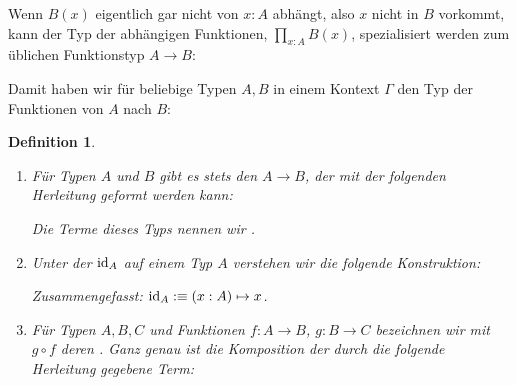 \documentclass[a4paper,12pt]{article}
\theoremstyle{break}
\newtheorem{definition}[theorem]{Definition}
\theoremstyle{nonumberbreak}
\theoremstyle{nonumberplain}
\begin{document}
Wenn $B(x)$ eigentlich gar nicht von $x:A$ abhängt, also $x$ nicht in $B$ vorkommt,
kann der Typ der abhängigen Funktionen, $\prod_{x:A}B(x)$, spezialisiert werden zum üblichen Funktionstyp $A\to B$:

Damit haben wir für beliebige Typen $A,B$ in einem Kontext $\Gamma$ den Typ der Funktionen von $A$ nach $B$:

\begin{definition}
  \begin{enumerate}
  \item Für Typen $A$ und $B$ gibt es stets den  $A\to B$, der mit der folgenden Herleitung geformt werden kann:
    \begin{mathpar}
    \end{mathpar}
    Die Terme dieses Typs nennen wir .
  \item Unter der  $\id_A$ auf einem Typ $A$ verstehen wir die folgende Konstruktion:
    \begin{mathpar}
    \end{mathpar}
    Zusammengefasst: $\id_A:\equiv (x : A)\mapsto x$.
  \item Für Typen $A,B,C$ und Funktionen $f:A\to B$, $g:B\to C$ bezeichnen wir mit $g\circ f$ deren .
    Ganz genau ist die Komposition der durch die folgende Herleitung gegebene Term:
    \begin{mathpar}
\end{mathpar}
\end{enumerate}
\end{definition}
\end{document}
